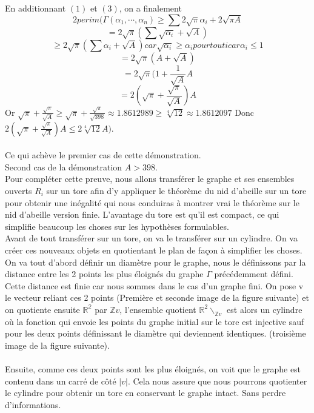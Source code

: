 \documentclass{book}
\begin{document}
\begin{preuve}
En additionnant $(1)$ et $(3)$, on a finalement 
$$2 perim(\Gamma(\alpha _1, \cdots, \alpha _n) \geq \sum 2 \sqrt{\pi} \alpha _i + 2 \sqrt{\pi A}$$
$$ = 2 \sqrt{\pi}(\sum \sqrt{\alpha _i} + \sqrt{A})$$
$$ \geq 2 \sqrt{\pi}(\sum \alpha _i + \sqrt{A}) car \sqrt{\alpha _i} \geq \alpha _i pour tout i car \alpha _i \leq 1$$
$$= 2 \sqrt{\pi}(A + \sqrt{A})$$
$$= 2 \sqrt{\pi}(1+\frac{1}{\sqrt{A}}A$$
$$= 2(\sqrt{\pi} + \frac{\sqrt{\pi}}{\sqrt{A}})A$$
Or $\sqrt{\pi} + \frac{\sqrt{\pi}}{\sqrt{A}} \geq \sqrt{\pi} + \frac{\sqrt{\pi}}{\sqrt{398}} \approx 1.8612989 \geq \sqrt[4]{12} \approx 1.8612097$
Donc $2 (\sqrt{\pi} + \frac{\sqrt{\pi}}{\sqrt{A}})A  \leq 2 \sqrt[4]{12} A)$.
\\\\
Ce qui achève le premier cas de cette démonstration.\\
Second cas de la démonstration $A > 398$.\\
Pour compléter cette preuve, nous allons transférer le graphe et ses ensembles ouverts $R_i$ sur un tore afin d'y appliquer le théorème du nid d'abeille sur un tore pour obtenir une inégalité qui nous conduiras à montrer vrai le théorème sur le nid d'abeille version finie. L'avantage du tore est qu'il est compact, ce qui simplifie beaucoup les choses sur les hypothèses formulables.\\
Avant de tout transférer sur un tore, on va le transférer sur un cylindre. On va créer ces nouveaux objets en quotientant le plan de façon à simplifier les choses.
\newpage
On va tout d'abord définir un diamètre pour le graphe, nous le définissons par la distance entre les 2 points les plus éloignés du graphe $\Gamma$ précédemment défini. Cette distance est finie car nous sommes dans le cas d'un graphe fini.
On pose v le vecteur reliant ces 2 points (Première et seconde image de la figure suivante) et on quotiente ensuite $\mathbb{R^2}$ par $\mathbb{Z} v$, l'ensemble quotient $\mathbb{R}^2 \backslash _{\mathbb{Z} v}$ est alors un cylindre où la fonction qui envoie les points du graphe initial sur le tore est injective sauf pour les deux points définissant le diamètre qui deviennent identiques. (troisième image de la figure suivante).\\\\
Ensuite, comme ces deux points sont les plus éloignés, on voit que le graphe est contenu dans un carré de côté $|v|$. Cela nous assure que nous pourrons quotienter le cylindre pour obtenir un tore en conservant le graphe intact. Sans perdre d'informations.\\\\

\end{preuve}
\end{document}

